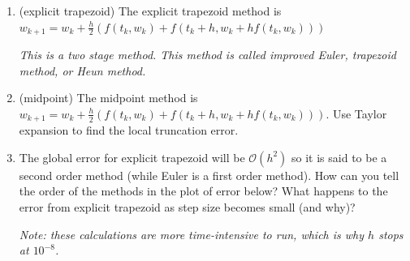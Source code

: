 \documentclass[12pt,letterpaper,noanswers]{exam}
\begin{document}
\begin{enumerate}[resume]
    \item (explicit trapezoid)
The explicit trapezoid method is
$w_{k+1} = w_k + \frac{h}{2}\left(f(t_k,w_k) + f(t_k+h, w_k + hf(t_k,w_k))\right)$

\emph{This is a two stage method.  This method is called improved Euler, trapezoid method, or Heun method.}

    

     \item (midpoint)
The midpoint method is
$w_{k+1} = w_k + \frac{h}{2}\left(f(t_k,w_k) + f(t_k+h, w_k + hf(t_k,w_k))\right)$.  Use Taylor expansion to find the local truncation error.
\vspace{1.5in}

    
    \item The global error for explicit trapezoid will be $\mathcal{O}(h^2)$ so it is said to be a second order method (while Euler is a first order method).  How can you tell the order of the methods in the plot of error below?  What happens to the error from explicit trapezoid as step size becomes small (and why)?

\emph{Note: these calculations are more time-intensive to run, which is why $h$ stops at $10^{-8}$.}
\end{enumerate}
\end{document}
